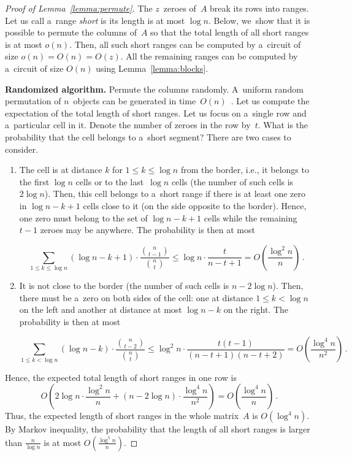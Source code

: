 \begin{proof}[Proof of Lemma~\ref{lemma:permute}]
The $z$~zeroes of~$A$ break its rows into ranges.
Let us call a~range {\em short} is its length is at most $\log n$.
Below, we~show that it is possible to permute the columns of~$A$
so that the total length of all short ranges is at most $o(n)$.
Then, all such short ranges can be computed by a~circuit of size
$o(n)=O(n)=O(z)$. All the remaining ranges can be
computed by a~circuit of size $O(n)$ using Lemma~\ref{lemma:blocks}.

\textbf{Randomized algorithm.}
Permute the columns randomly. A~uniform random permutation
of $n$~objects can be generated in
time~$O(n)$~\cite[Algorithm~P (Shuffling)]{DBLP:books/lib/Knuth98}.
Let us compute the expectation of
the total length of short ranges.
Let us focus on a~single row and a~particular cell in it. Denote the number of
zeroes in the row by~$t$. What is the probability that the cell belongs to
a~short segment? There are two cases to consider.


\begin{enumerate}
\item The cell is at distance $k$ for $1 \le k \le \log n$ from the border,
i.e., it belongs to the first $\log n$ cells or to the last~$\log n$ cells
(the number of such cells is $2\log n$). Then,
this cell belongs to a~short range if there is at least one zero
in $\log n - k + 1$ cells close to it (on the side opposite to the border).
Hence, one zero must belong to the set of $\log n - k + 1$ cells while the
remaining $t-1$ zeroes may be anywhere. The probability is then at most

\[\sum_{1 \le k \le \log n}(\log n - k + 1) \cdot \frac{\binom{n}{t-1}}{\binom{n}{t}} \le \log n \cdot \frac{t}{n-t+1}=O\left(\frac{\log^2n}{n}\right) \, .\]

\item It is not close to the border (the number of such cells is $n-2\log n$).
Then, there must be a~zero on both sides of the cell: one at
distance $1 \le k < \log n$ on the left and another at distance at most
$\log n - k$ on the right. The probability is then at most

\[\sum_{1 \le k < \log n}(\log n - k) \cdot \frac{\binom{n}{t-2}}{\binom{n}{t}} \le \log^2n \cdot \frac{t(t-1)}{(n-t+1)(n-t+2)}=O\left(\frac{\log^4 n}{n^2}\right) \, .\]

\end{enumerate}
Hence, the expected total length of short ranges in one row is
\[O\left( 2\log n \cdot \frac{\log^2 n}{n} + (n-2\log n) \cdot \frac{\log^4 n}{n^2}\right)=O\left(\frac{\log^4 n}{n}\right) \, .\]
Thus, the expected length of short ranges in the whole
matrix~$A$ is $O(\log^4n)$. By Markov inequality, the probability that
the length of all short ranges is larger than $\frac{n}{\log n}$ is
at most $O(\frac{\log^5 n}{n})$.


\end{proof}
